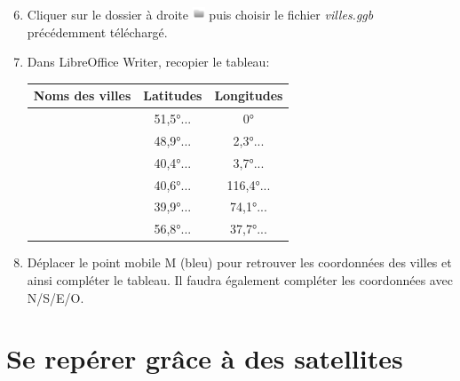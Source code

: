 \documentclass[svgnames,11pt]{beamer}
\begin{document}
\begin{frame}
    \frametitle{}
    \setcounter{compteuractivite}{0}
    \begin{activite}
        \begin{enumerate}
            \setcounter{enumi}{5}
            \item Cliquer sur le dossier à droite \includegraphics[height=1em]{ressources/folder.png} puis choisir le fichier \emph{villes.ggb} précédemment téléchargé.
            \item Dans LibreOffice Writer, recopier le tableau: \begin{center}
                \begin{tabular}{|*{3}{c|}}
                    \hline
                    Noms des villes & Latitudes & Longitudes \\
                    \hline
                                    & 51,5°...  & 0°         \\
                    \hline
                                    & 48,9°...  & 2,3°...    \\
                    \hline
                                    & 40,4°...  & 3,7°...    \\
                    \hline
                                    & 40,6°...  & 116,4°...  \\
                    \hline
                                    & 39,9°...  & 74,1°...   \\
                    \hline
                                    & 56,8°...  & 37,7°...   \\
                    \hline
                \end{tabular}
            \end{center}
            \item Déplacer le point mobile M (bleu) pour retrouver les coordonnées des villes et ainsi compléter le tableau. Il faudra également compléter les coordonnées avec N/S/E/O.
                  
        \end{enumerate}
    \end{activite}

\end{frame}
\section{Se repérer grâce à des satellites}
\end{document}
